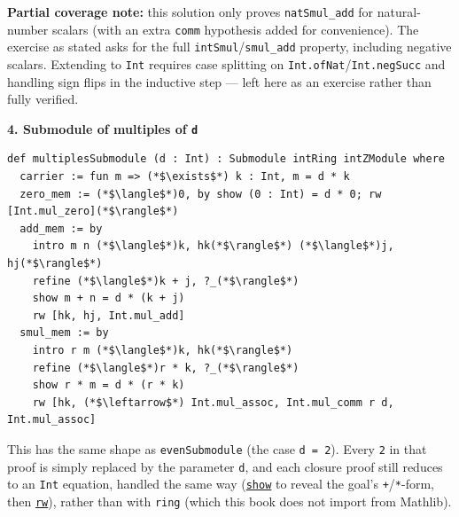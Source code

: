 \textbf{Partial coverage note:} this solution only proves \texttt{natSmul\_\allowbreak{}add} for natural-number scalars (with an extra \texttt{comm} hypothesis added for convenience). The exercise as stated asks for the full \texttt{intSmul}/\texttt{smul\_\allowbreak{}add} property, including negative scalars. Extending to \texttt{Int} requires case splitting on \texttt{Int.ofNat}/\texttt{Int.negSucc} and handling sign flips in the inductive step --- left here as an exercise rather than fully verified.

\textbf{4. Submodule of multiples of \texttt{d}}

\begin{lstlisting}
def multiplesSubmodule (d : Int) : Submodule intRing intZModule where
  carrier := fun m => (*$\exists$*) k : Int, m = d * k
  zero_mem := (*$\langle$*)0, by show (0 : Int) = d * 0; rw [Int.mul_zero](*$\rangle$*)
  add_mem := by
    intro m n (*$\langle$*)k, hk(*$\rangle$*) (*$\langle$*)j, hj(*$\rangle$*)
    refine (*$\langle$*)k + j, ?_(*$\rangle$*)
    show m + n = d * (k + j)
    rw [hk, hj, Int.mul_add]
  smul_mem := by
    intro r m (*$\langle$*)k, hk(*$\rangle$*)
    refine (*$\langle$*)r * k, ?_(*$\rangle$*)
    show r * m = d * (r * k)
    rw [hk, (*$\leftarrow$*) Int.mul_assoc, Int.mul_comm r d, Int.mul_assoc]
\end{lstlisting}

This has the same shape as \texttt{evenSubmodule} (the case \texttt{d = 2}). Every \texttt{2} in that proof is simply replaced by the parameter \texttt{d}, and each closure proof still reduces to an \texttt{Int} equation, handled the same way (\href{https://lean-lang.org/doc/reference/latest/Tactic-Proofs/Tactic-Reference/}{\texttt{show}} to reveal the goal's \texttt{+}/\texttt{*}-form, then \href{https://lean-lang.org/doc/reference/latest/Tactic-Proofs/Tactic-Reference/}{\texttt{rw}}), rather than with \texttt{ring} (which this book does not import from Mathlib).

